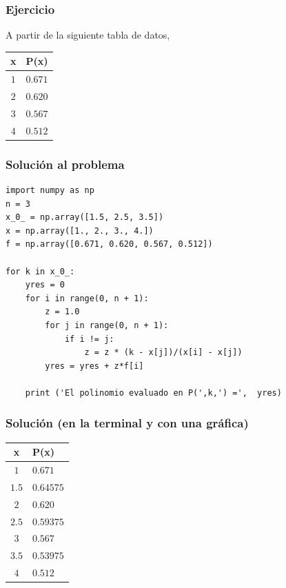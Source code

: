 \begin{frame}
\frametitle{Ejercicio}
\begin{minipage}{5cm}
A partir de la siguiente tabla de datos,
\\
\medskip
\begin{center}
\begin{tabular}{c | c}
x & P(x) \\
\hline $1$ & $0.671$ \\
\hline $2$ & $0.620$ \\
\hline $3$ & $0.567$ \\
\hline $4$ & $0.512$
\end{tabular}
\end{center}
\end{minipage}
\hspace{0.3cm}
\end{frame}
\begin{frame}
\frametitle{Solución al problema}
\begin{lstlisting}[caption=Código para la interpolación de Lagrange,style= FormattedNumber, basicstyle=\linespread{0.9}\ttfamily\small, columns=fullflexible]
import numpy as np
n = 3
x_0_ = np.array([1.5, 2.5, 3.5])
x = np.array([1., 2., 3., 4.])
f = np.array([0.671, 0.620, 0.567, 0.512])

for k in x_0_:
    yres = 0
    for i in range(0, n + 1):
        z = 1.0
        for j in range(0, n + 1):
            if i != j:
                z = z * (k - x[j])/(x[i] - x[j])
        yres = yres + z*f[i]
    
    print ('El polinomio evaluado en P(',k,') =',  yres)
\end{lstlisting}
\end{frame}
\begin{frame}[fragile]
\frametitle{Solución (en la terminal y con una gráfica)}
\begin{center}
\begin{tabular}{c | l}
x & P(x) \\
\hline $1$   & $0.671$ \\
\hline $1.5$ & $0.64575$ \\
\hline $2$   & $0.620$ \\
\hline $2.5$ & $0.59375$ \\
\hline $3$   & $0.567$ \\
\hline $3.5$ & $0.53975$ \\
\hline $4$   & $0.512$
\end{tabular}
\end{center}
\end{frame}
